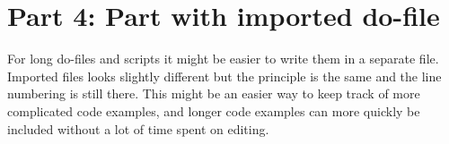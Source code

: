 \documentclass{tufte-handout}
\begin{document}
\section{Part 4: Part with imported do-file}

For long do-files and scripts it might be easier to write them in a separate file. Imported files looks slightly different but the principle is the same and the line numbering is still there. This might be an easier way to keep track of more complicated code examples, and longer code examples can more quickly be included without a lot of time spent on editing.
\end{document}
